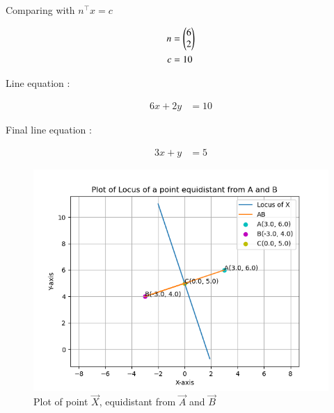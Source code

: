 \documentclass[journal]{IEEEtran}
\begin{document}
Comparing with $n^\top x=c$

\begin{align}
	n&=\begin{pmatrix}6 \\ 2\end{pmatrix}\\
	c&=10
\end{align}

Line equation :

\begin{align}
	6x+2y&=10
\end{align}

Final line equation :

\begin{align}
	3x+y&=5
\end{align}

\begin{figure}[h!]
   \centering
   \includegraphics[width=0.8\linewidth]{figs/plot.png}
   \caption{Plot of point $\vec{X}$, equidistant from $\vec{A}$ and $\vec{B}$}
\label{Plot}
\end{figure}
\end{document}
